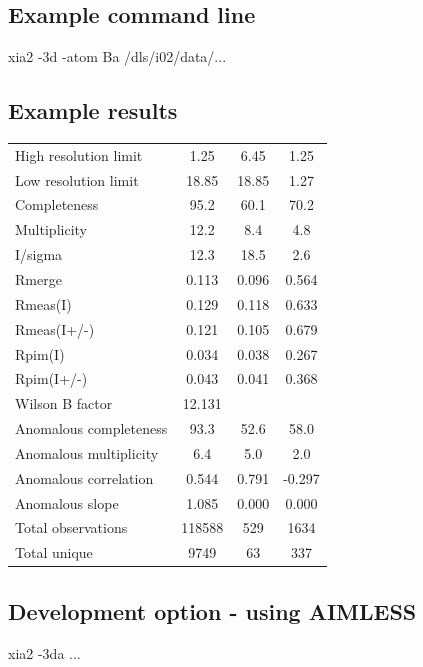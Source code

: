 \documentclass[a4paper, 11pt]{article}
\begin{document}
\subsection{Example command line}
{ \huge
xia2 -3d -atom Ba /dls/i02/data/...
}

\subsection{Example results}
\begin{tabular}{lccc}
High resolution limit      &       1.25 &    6.45 &   1.25\\
Low resolution limit       &                18.85  & 18.85  &  1.27\\
Completeness               &                95.2   & 60.1  &  70.2\\
Multiplicity               &               12.2    & 8.4   &  4.8\\
I/sigma                    &               12.3    & 18.5   &  2.6\\
Rmerge                     &             0.113  & 0.096 &  0.564\\
Rmeas(I)                   &             0.129  & 0.118 &  0.633\\
Rmeas(I+/-)                &             0.121  & 0.105 &  0.679\\
Rpim(I)                    &             0.034  & 0.038 &  0.267\\
Rpim(I+/-)                 &             0.043  & 0.041 &  0.368\\
Wilson B factor            &            12.131& & \\
Anomalous completeness     &            93.3  &  52.6  &  58.0\\
Anomalous multiplicity     &           6.4    & 5.0  &   2.0\\
Anomalous correlation      &            0.544 &  0.791 & -0.297\\
Anomalous slope            &      1.085 &  0.000 &  0.000\\
Total observations         &       118588 & 529  &   1634\\
Total unique               &         9749  &  63 &     337\\
\end{tabular}

\subsection{Development option - using AIMLESS}
{ \huge
xia2 -3da ...
}
\end{document}
